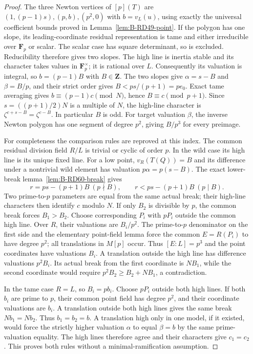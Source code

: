 \begin{proof}
The three Newton vertices of $[p](T)$ are
$(1,(p-1)s),(p,b),(p^2,0)$ with $b=v_L(u)$, using exactly the
universal coefficient bounds proved in Lemma~\ref{lem:B-RD49-point}.
If the polygon has one slope, its leading-coordinate residual
representation is tame and either irreducible over $\mathbf F_p$
or scalar. The scalar case has square determinant, so is excluded.
Reducibility therefore gives two slopes. The high line is inertia
stable and its character takes values in $\mathbf F_p^\times$;
it is rational over $L$. Consequently its valuation is integral,
so $b=(p-1)B$ with $B\in\mathbf Z$. The two slopes give
$\alpha=s-B$ and $\beta=B/p$, and their strict order gives
$B<ps/(p+1)=pe_0$. Exact tame averaging gives
$b\equiv(p-1)c\pmod N$, hence $B\equiv c\pmod{p+1}$.
Since $s=((p+1)/2)N$ is a multiple of $N$, the high-line character
is $\zeta^{c+s-B}=\zeta^{c-B}$. In particular $B$ is odd.
For target valuation $\beta$, the inverse Newton polygon has one
segment of degree $p^2$, giving $B/p^3$ for every preimage.

For completeness the comparison rules are reproved at this index.
The common residual division field $R/L$ is trivial or cyclic of
order $p$. In the wild case its high line is its unique fixed line.
For a low point, $v_R(T(Q))=B$ and its difference under a nontrivial
wild element has valuation $p\alpha=p(s-B)$. The exact lower-break
lemma~\ref{lem:B-RD60-break} gives
\[
 r=ps-(p+1)B\ (p\nmid B),\qquad
 r<ps-(p+1)B\ (p\mid B).                              \tag{B-RD66.3}
\]
Two prime-to-$p$ parameters are equal from the same actual break;
their high-line characters then identify $c$ modulo $N$.
If only $B_2$ is divisible by $p$, the common break forces
$B_1>B_2$. Choose corresponding $P_i$ with $pP_i$ outside the
common high line. Over $R$, their valuations are $B_i/p^2$.
The prime-to-$p$ denominator on the first side and the elementary
point-field lemma force the common $E=R(P_i)$ to have degree $p^2$;
all translations in $M[p]$ occur. Thus $[E:L]=p^3$ and the point
coordinates have valuations $B_i$. A translation outside the high
line has difference valuations $p^2B_i$. Its actual break from the
first coordinate is $NB_1$, while the second coordinate would require
$p^2B_2\ge B_2+NB_1$, a contradiction.

In the tame case $R=L$, so $B_i=pb_i$. Choose $pP_i$ outside both
high lines. If both $b_i$ are prime to $p$, their common point field
has degree $p^2$, and their coordinate valuations are $b_i$.
A translation outside both high lines gives the same break
$Nb_1=Nb_2$. Thus $b_1=b_2=b$. A translation high only in one
model, if it existed, would force the strictly higher valuation
$\alpha$ to equal $\beta=b$ by the same prime-valuation equality.
The high lines therefore agree and their characters give $c_1=c_2$.
This proves both rules without a minimal-ramification assumption.
\end{proof}


